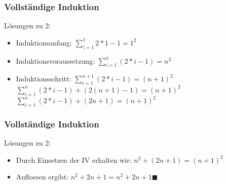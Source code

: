 \begin{frame}
    \frametitle{Vollständige Induktion}
    Lösungen zu 2:
        \begin{itemize}
            \vfill \item Induktionsanfang:
            \vfill \newline $\sum_{i=1}^{1} 2*1-1 = 1^2$
            \vfill \item Induktionsvoraussetzung:
            \vfill \newline $\sum_{i=1}^{n} (2*i-1) = n^2$
            \vfill \item Induktionsschritt:
            \vfill \newline $\sum_{i=1}^{n+1} (2*i-1) = (n+1)^2$
            \vfill \newline $\sum_{i=1}^{n} (2*i-1)+(2(n+1)-1) = (n+1)^2$
            \vfill \newline $\sum_{i=1}^{n} (2*i-1)+(2n+1) = (n+1)^2$
        \end{itemize}

\end{frame}

\begin{frame}
    \frametitle{Vollständige Induktion}
    Lösungen zu 2:
        \begin{itemize}
            \vfill \item Durch Einsetzen der IV erhalten wir:
            \vfill \newline $n^2+(2n+1) = (n+1)^2$
            \vfill \item Aufloesen ergibt:
            \vfill \newline $n^2+2n+1 = n^2 + 2n + 1 \blacksquare$
        \end{itemize}
\end{frame}